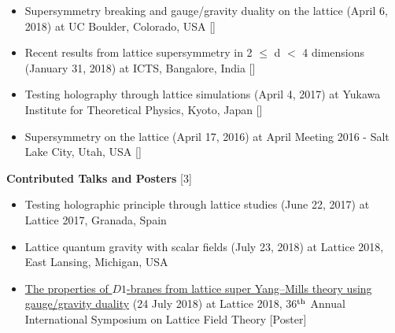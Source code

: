 \begin{itemize}
  \item Supersymmetry breaking and gauge/gravity duality on the lattice (April 6, 2018) at UC Boulder, Colorado, USA 
    [] 
  \vspace{1mm} 
  
  
  \item Recent results from lattice supersymmetry in 2 $\le$ d $<$ 4 dimensions (January 31, 2018) at ICTS, Bangalore, India 
   [] 
  \vspace{1mm} 
  
 \item Testing holography through lattice simulations (April 4, 2017) at Yukawa Institute for Theoretical Physics, Kyoto, Japan
  []  
 \vspace{1mm} 
 
 
\item Supersymmetry on the lattice (April 17, 2016) at April Meeting 2016 - Salt Lake City, Utah, USA 
 [] 
\end{itemize}



\textcolor{alizarin}{\textbf{\fontsize{10}{38} \bfseries Contributed Talks and Posters} [3]}
\begin{itemize}
  \item Testing holographic principle through lattice studies (June 22, 2017) at Lattice 2017, Granada, Spain \vspace{1mm} 
  \item Lattice quantum gravity with scalar fields (July 23, 2018) at Lattice 2018, East Lansing, Michigan, USA   
  \item \href{https://indico.fnal.gov/event/15949/session/4/contribution/66}{The properties of $D1$-branes from lattice super Yang--Mills theory using gauge/gravity duality} (24 July 2018) 
 at Lattice 2018, 36$^{\rm{th}}$ Annual International Symposium on Lattice Field Theory [Poster] 
\end{itemize}
 
